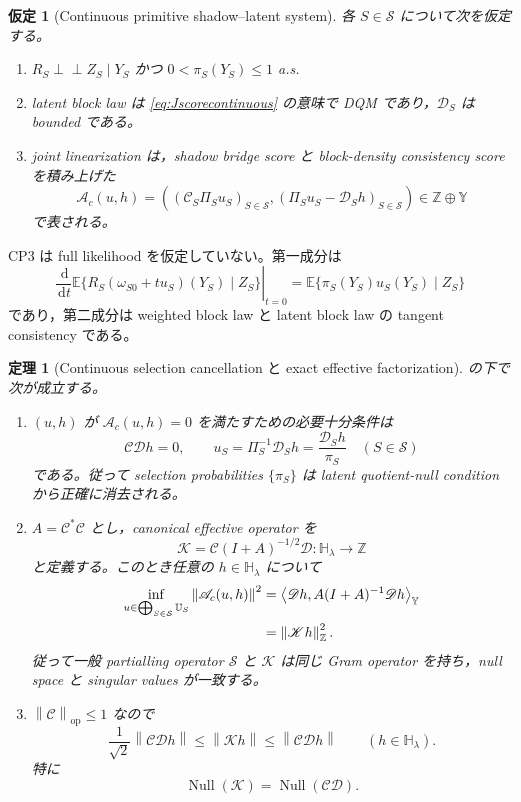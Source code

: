 \documentclass[11pt,a4paper]{ltjsarticle}
\newtheorem{assumption}{仮定}[section]
\newtheorem{theorem}{定理}[section]
\theoremstyle{remark}
\newcommand{\E}{\mathbb E}
\newcommand{\ind}{\perp\!\!\!\perp}
\newcommand{\dd}{\,\mathrm d}
\newcommand{\norm}[1]{\left\lVert#1\right\rVert}
\newcommand{\inner}[2]{\left\langle#1,#2\right\rangle}
\newcommand{\cS}{\mathcal S}
\newcommand{\Aop}{\mathscr A}
\newcommand{\Sop}{\mathscr S}
\newcommand{\Cop}{\mathscr C}
\newcommand{\Jcal}{\mathscr D}
\newcommand{\Kop}{\mathscr K}
\newcommand{\Null}{\operatorname{Null}}
\newcommand{\op}{\operatorname{op}}
\begin{document}
\begin{assumption}[Continuous primitive shadow--latent system]\label{as:continuousprimitive}
各 $S\in\cS$ について次を仮定する。
\begin{enumerate}[label=(CP\arabic*)]
\item $R_S\ind Z_S\mid Y_S$ かつ $0<\pi_S(Y_S)\le1$ a.s.
\item latent block law は \eqref{eq:Jscorecontinuous} の意味で DQM であり，$\Jcal_S$ は bounded である。
\item joint linearization は，shadow bridge score と block-density consistency score を積み上げた
\begin{equation}
\Aop_c(u,h)
=
\left(
(\Cop_S\Pi_Su_S)_{S\in\cS},
(\Pi_Su_S-\Jcal_Sh)_{S\in\cS}
\right)
\in\mathbb Z\oplus\mathbb Y
\label{eq:Accontinuous}
\end{equation}
で表される。
\end{enumerate}
\end{assumption}

CP3 は full likelihood を仮定していない。第一成分は
\[
\left.\frac{\dd}{\dd t}
\E\{R_S(\omega_{S0}+tu_S)(Y_S)\mid Z_S\}
\right|_{t=0}
=\E\{\pi_S(Y_S)u_S(Y_S)\mid Z_S\}
\]
であり，第二成分は weighted block law と latent block law の tangent consistency である。


\begin{theorem}[Continuous selection cancellation と exact effective factorization]\label{thm:continuousfactor}
の下で次が成立する。
\begin{enumerate}[label=(\roman*)]
\item $(u,h)$ が $\Aop_c(u,h)=0$ を満たすための必要十分条件は
\begin{equation}
\Cop\Jcal h=0,
\qquad
u_S=\Pi_S^{-1}\Jcal_Sh
=\frac{\Jcal_Sh}{\pi_S}
\quad(S\in\cS)
\label{eq:continuouscancelnull}
\end{equation}
である。従って selection probabilities $\{\pi_S\}$ は latent quotient-null condition から正確に消去される。
\item $A=\Cop^*\Cop$ とし，canonical effective operator を
\begin{equation}
\Kop
=\Cop(I+A)^{-1/2}\Jcal:
\mathbb H_\lambda\to\mathbb Z
\label{eq:Kcanonical}
\end{equation}
と定義する。このとき任意の $h\in\mathbb H_\lambda$ について
\begin{align}
\inf_{u\in\bigoplus_{S\in\cS}\mathbb U_S}
\norm{\Aop_c(u,h)}^2
&=\inner{\Jcal h}{A(I+A)^{-1}\Jcal h}_{\mathbb Y}
\notag\\
&=\norm{\Kop h}_{\mathbb Z}^2.
\label{eq:exactprimitiveprofile}
\end{align}
従って一般 partialling operator $\Sop$ と $\Kop$ は同じ Gram operator を持ち，null space と singular values が一致する。
\item $\norm{\Cop}_{\op}\le1$ なので
\begin{equation}
\frac1{\sqrt2}\norm{\Cop\Jcal h}
\le
\norm{\Kop h}
\le
\norm{\Cop\Jcal h}
\qquad(h\in\mathbb H_\lambda).
\label{eq:CJKequivalence}
\end{equation}
特に
\[
\Null(\Kop)=\Null(\Cop\Jcal).
\]
\end{enumerate}
\end{theorem}
\end{document}
